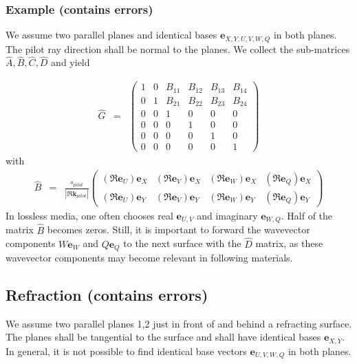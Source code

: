 \documentclass[12pt,a4paper,twoside,openright,BCOR10mm,headsepline,titlepage,abstracton,chapterprefix,final]{scrreprt}
\newcommand\Vector[1]{{\mathbf{#1}}}
\newcommand\wavenumber{k}
\newcommand\Wavevector{\Vector{\wavenumber}}
\begin{document}
\subsubsection{Example (contains errors)}
We assume two parallel planes and identical bases $\Vector{e}_{X,Y,U,V,W,Q}$ in both planes. 
The pilot ray direction shall be normal to the planes.
We collect the sub-matrices $\hat{A}, \hat{B}, \hat{C}, \hat{D}$ and yield

\begin{eqnarray}
 \hat{G} &=&
 \begin{pmatrix}
  1 & 0 & B_{11} & B_{12} & B_{13} & B_{14} \\
  0 & 1 & B_{21} & B_{22} & B_{23} & B_{24} \\
  0 & 0 & 1 & 0 & 0 & 0 \\
  0 & 0 & 0 & 1 & 0 & 0 \\
  0 & 0 & 0 & 0 & 1 & 0 \\
  0 & 0 & 0 & 0 & 0 & 1  
 \end{pmatrix}
 \label{eq:xyuv_propagation_homogeneous}
\end{eqnarray}
with\begin{eqnarray}
 \hat{B} &=&
 \frac{ s_{pilot} }{| \Re \Wavevector_{pilot} |}
 \begin{pmatrix}
  (\Re \Vector{e}_U) \Vector{e}_X & (\Re \Vector{e}_V) \Vector{e}_X & (\Re \Vector{e}_W) \Vector{e}_X & (\Re \Vector{e}_Q) \Vector{e}_X \\
  (\Re \Vector{e}_U) \Vector{e}_Y & (\Re \Vector{e}_V) \Vector{e}_Y & (\Re \Vector{e}_W) \Vector{e}_Y & (\Re \Vector{e}_Q) \Vector{e}_Y
 \end{pmatrix}
\end{eqnarray}
In lossless media, one often chooses real $\Vector{e}_{U,V}$ and imaginary $\Vector{e}_{W,Q}$.
Half of the matrix $\hat{B}$ becomes zeros.
Still, it is important to forward the wavevector components 
$W \Vector{e}_W$ and $Q \Vector{e}_Q$
to the next surface with the $\hat{D}$ matrix, 
as these wavevector components may become relevant in following materials.

\subsection{Refraction (contains errors)}
We assume two parallel planes 1,2 just in front of and behind a refracting surface.
The planes shall be tangential to the surface 
and shall have identical bases $\Vector{e}_{X,Y}$.
In general, it is not possible to find identical base vectors $\Vector{e}_{U,V,W,Q}$ in both planes.
\end{document}
